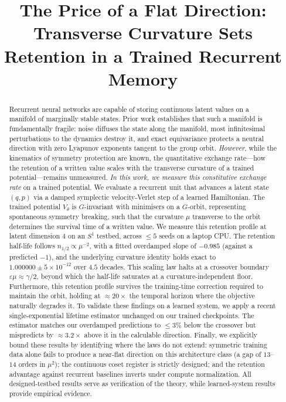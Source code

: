 \documentclass{article}
\title{The Price of a Flat Direction:\\ Transverse Curvature Sets Retention in a Trained Recurrent Memory}
\author{}
\begin{document}
\maketitle
\begin{abstract}
Recurrent neural networks are capable of storing continuous latent values on a manifold of marginally stable states. Prior work establishes that such a manifold is fundamentally fragile: noise diffuses the state along the manifold, most infinitesimal perturbations to the dynamics destroy it, and exact equivariance protects a neutral direction with zero Lyapunov exponents tangent to the group orbit. \emph{However}, while the kinematics of symmetry protection are known, the quantitative exchange rate---how the retention of a written value scales with the transverse curvature of a trained potential---remains unmeasured. \emph{In this work, we measure this constitutive exchange rate} on a trained potential. We evaluate a recurrent unit that advances a latent state $(q,p)$ via a damped symplectic velocity-Verlet step of a learned Hamiltonian. The trained potential $V_\theta$ is $G$-invariant with minimisers on a $G$-orbit, representing spontaneous symmetry breaking, such that the curvature $\mu$ transverse to the orbit determines the survival time of a written value. We measure this retention profile at latent dimension $4$ on an $S^1$ testbed, across $\le5$ seeds on a laptop CPU. The retention half-life follows $n_{1/2}\propto\mu^{-2}$, with a fitted overdamped slope of $-0.985$ (against a predicted $-1$), and the underlying curvature identity holds exact to $1.000000\pm5\!\times\!10^{-12}$ over $4.5$ decades. This scaling law halts at a crossover boundary $\varepsilon\mu\approx\gamma/2$, beyond which the half-life saturates at a curvature-independent floor. Furthermore, this retention profile survives the training-time correction required to maintain the orbit, holding at $\approx20\times$ the temporal horizon where the objective naturally degrades it. To validate these findings on a learned system, we apply a recent single-exponential lifetime estimator unchanged on our trained checkpoints. The estimator matches our overdamped predictions to $\le3\%$ below the crossover but mispredicts by $\approx3.2\times$ above it in the calculable direction. Finally, we explicitly bound these results by identifying where the laws do not extend: symmetric training data alone fails to produce a near-flat direction on this architecture class (a gap of $13$--$14$ orders in $\mu^2$); the continuous coset register is strictly designed; and the retention advantage against recurrent baselines inverts under compute normalization. All designed-testbed results serve as verification of the theory, while learned-system results provide empirical evidence.
\end{abstract}
\end{document}
